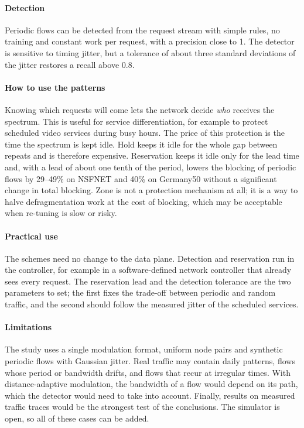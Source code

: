 \documentclass[preprint,12pt]{elsarticle}
\begin{document}
\paragraph{Detection} Periodic flows can be detected from the request stream with simple rules, no training and constant work per request, with a precision close to 1. The detector is sensitive to timing jitter, but a tolerance of about three standard deviations of the jitter restores a recall above 0.8.

\paragraph{How to use the patterns} Knowing which requests will come lets the network decide \emph{who} receives the spectrum. This is useful for service differentiation, for example to protect scheduled video services during busy hours. The price of this protection is the time the spectrum is kept idle. Hold keeps it idle for the whole gap between repeats and is therefore expensive. Reservation keeps it idle only for the lead time and, with a lead of about one tenth of the period, lowers the blocking of periodic flows by 29--49\% on NSFNET and 40\% on Germany50 without a significant change in total blocking. Zone is not a protection mechanism at all; it is a way to halve defragmentation work at the cost of blocking, which may be acceptable when re-tuning is slow or risky.

\paragraph{Practical use} The schemes need no change to the data plane. Detection and reservation run in the controller, for example in a software-defined network controller that already sees every request. The reservation lead and the detection tolerance are the two parameters to set; the first fixes the trade-off between periodic and random traffic, and the second should follow the measured jitter of the scheduled services.

\paragraph{Limitations} The study uses a single modulation format, uniform node pairs and synthetic periodic flows with Gaussian jitter. Real traffic may contain daily patterns, flows whose period or bandwidth drifts, and flows that recur at irregular times. With distance-adaptive modulation, the bandwidth of a flow would depend on its path, which the detector would need to take into account. Finally, results on measured traffic traces would be the strongest test of the conclusions. The simulator is open, so all of these cases can be added.
\end{document}
